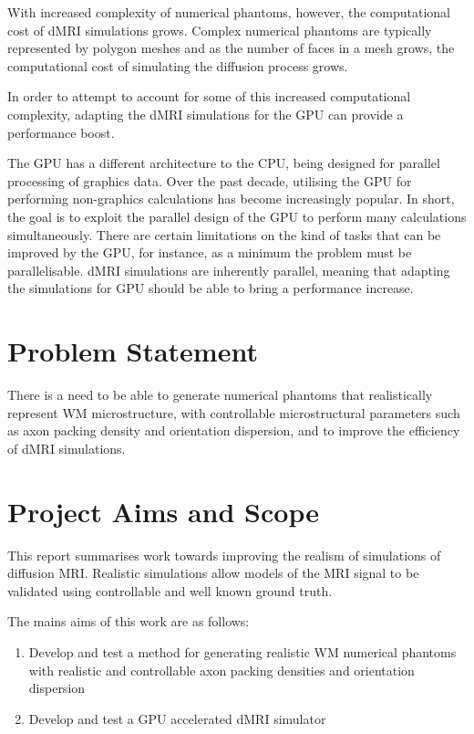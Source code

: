 With increased complexity of numerical phantoms, however, the computational cost of \ac{dMRI} simulations grows. Complex numerical phantoms are typically represented by polygon meshes and as the number of faces in a mesh grows, the computational cost of simulating the diffusion process grows.

In order to attempt to account for some of this increased computational complexity, adapting the \ac{dMRI} simulations for the \ac{GPU} can provide a performance boost.

The \ac{GPU} has a different architecture to the \ac{CPU}, being designed for parallel processing of graphics data.
Over the past decade, utilising the GPU for performing non-graphics calculations has become increasingly popular. 
In short, the goal is to exploit the parallel design of the \ac{GPU} to perform  many calculations simultaneously.
There are certain limitations on the kind of tasks that can be improved by the \ac{GPU}, for instance, as a minimum the problem must be parallelisable.
\ac{dMRI} simulations are inherently parallel, meaning that adapting the simulations for \ac{GPU} should be able to bring a performance increase. 

\section{Problem Statement}
\label{sec:intro_problem_statement}
There is a need to be able to generate numerical phantoms that realistically represent \ac{WM} microstructure, with controllable microstructural parameters such as axon packing density and orientation dispersion, and to improve the efficiency of \ac{dMRI} simulations.


\section{Project Aims and Scope}
\label{sec:intro_project_aims}
This report summarises work towards improving the realism of simulations of diffusion \ac{MRI}. Realistic simulations allow models of the MRI signal to be validated using controllable and well known ground truth.

 

The mains aims of this work are as follows:
\begin{enumerate}
\item Develop and test a method for generating realistic \ac{WM} numerical phantoms with realistic and controllable axon packing densities and orientation dispersion
\item Develop and test a \ac{GPU} accelerated \ac{dMRI} simulator
\end{enumerate}

